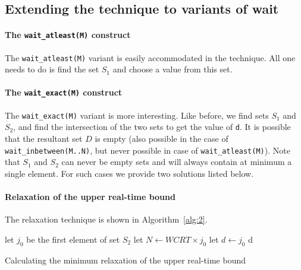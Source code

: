 \subsection{Extending the technique to variants of wait}
\label{sec:extend-tehcn-vari}

\paragraph{The \texttt{wait\_atleast(M)} construct}
\label{sec:extend-techn-vari}

The \texttt{wait\_atleast(M)} variant is easily accommodated in the
technique. All one needs to do is find the set $S_1$ and choose a value
from this set.

\paragraph{The \texttt{wait\_exact(M)} construct}
\label{sec:extend-techn-vari}

The \texttt{wait\_exact(M)} variant is more interesting. Like before,
we find sets $S_1$ and $S_2$, and find the intersection of the two sets
to get the value of \texttt{d}. It is possible %
that the resultant set $D$ is empty (also possible in the case of
\texttt{wait\_inbetween(M..N)}, but never possible in case of
\texttt{wait\_atleast(M)}). Note that $S_1$ and $S_2$ can never be empty
sets and will always contain at minimum a single element. For such cases
we provide two solutions listed below.


\paragraph{Relaxation of the upper real-time bound}
\label{sec:over-appr-relax}

The relaxation technique is shown in Algorithm~\ref{alg:2}.
  
\begin{algorithm}[t!]
  \begin{minipage}{1.0\linewidth}
    \SetAlgoLined
     {
      let $j_{0}$ be the first element of set $S_2$\;
      \ShowLn let $N \leftarrow WCRT \times j_0$\;
      let $d \leftarrow j_0$\;
    }
    \Return d\;
    \caption{Calculating the minimum relaxation of the upper real-time
      bound}
    \label{alg:2}
  \end{minipage}
\end{algorithm}


